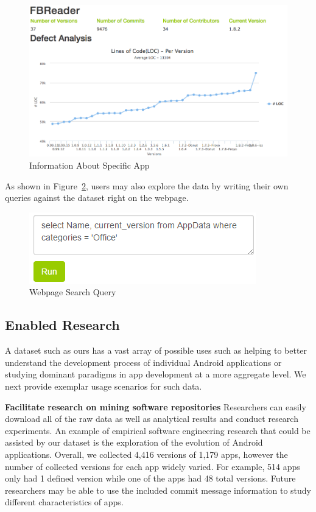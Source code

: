 \documentclass[conference]{IEEEtran}
\begin{document}
\begin{figure}[ht!]
\centering
\includegraphics[width=\columnwidth, angle = 0]{images/FBReader.png}
\caption{Information About Specific App}
\label{fig:specificAppInfo}
\end{figure}


As shown in Figure~\ref{fig:webpagequery}, users may also explore the data by writing their own queries against the dataset right on the webpage.

\begin{figure}[ht!]
\centering
\includegraphics[width=\columnwidth, angle = 0, scale=.8]{images/webpageQuery.png}
\caption{Webpage Search Query}
\label{fig:webpagequery}
\end{figure}


\subsection{Enabled Research}

A dataset such as ours has a vast array of possible uses such as helping to better understand the development process of individual Android applications or studying dominant paradigms in app development at a more aggregate level. We next provide exemplar usage scenarios for such data.

\textbf{Facilitate research on mining software repositories}
Researchers can easily download all of the raw data as well as analytical results and conduct research experiments. An example of empirical software engineering research that could be assisted by our dataset is the exploration of the evolution of Android applications. Overall, we collected 4,416 versions of 1,179 apps, however the number of collected versions for each app widely varied. For example, 514 apps only had 1 defined version while one of the apps had 48 total versions. Future researchers may be able to use the included commit message information to study different characteristics of apps. 
\end{document}
